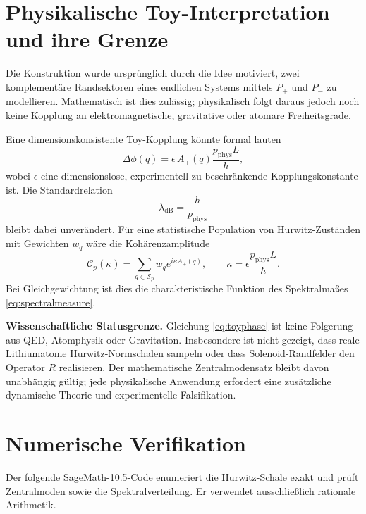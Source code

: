 \documentclass[11pt,a4paper]{article}
\theoremstyle{definition}
\begin{document}
\section{Physikalische Toy-Interpretation und ihre Grenze}\label{sec:physics}
Die Konstruktion wurde ursprünglich durch die Idee motiviert, zwei komplementäre Randsektoren eines endlichen Systems mittels $P_+$ und $P_-$ zu modellieren. Mathematisch ist dies zulässig; physikalisch folgt daraus jedoch noch keine Kopplung an elektromagnetische, gravitative oder atomare Freiheitsgrade.

Eine dimensionskonsistente Toy-Kopplung könnte formal lauten
\begin{equation}\label{eq:toyphase}
\Delta\phi(q)=\epsilon\,A_+(q)\frac{p_{\mathrm{phys}}L}{\hbar},
\end{equation}
wobei $\epsilon$ eine dimensionslose, experimentell zu beschränkende Kopplungskonstante ist. Die Standardrelation
\[
\lambda_{\mathrm{dB}}=\frac{h}{p_{\mathrm{phys}}}
\]
bleibt dabei unverändert. Für eine statistische Population von Hurwitz-Zuständen mit Gewichten $w_q$ wäre die Kohärenzamplitude
\begin{equation}\label{eq:charfunction}
\mathcal C_p(\kappa)=\sum_{q\in\mathcal S_p}w_q e^{i\kappa A_+(q)},
\qquad
\kappa=\epsilon\frac{p_{\mathrm{phys}}L}{\hbar}.
\end{equation}
Bei Gleichgewichtung ist dies die charakteristische Funktion des Spektralmaßes \eqref{eq:spectralmeasure}.

\textbf{Wissenschaftliche Statusgrenze.} Gleichung \eqref{eq:toyphase} ist keine Folgerung aus QED, Atomphysik oder Gravitation. Insbesondere ist nicht gezeigt, dass reale Lithiumatome Hurwitz-Normschalen sampeln oder dass Solenoid-Randfelder den Operator $R$ realisieren. Der mathematische Zentralmodensatz bleibt davon unabhängig gültig; jede physikalische Anwendung erfordert eine zusätzliche dynamische Theorie und experimentelle Falsifikation.

\section{Numerische Verifikation}
Der folgende SageMath-10.5-Code enumeriert die Hurwitz-Schale exakt und prüft Zentralmoden sowie die Spektralverteilung. Er verwendet ausschließlich rationale Arithmetik.
\end{document}
